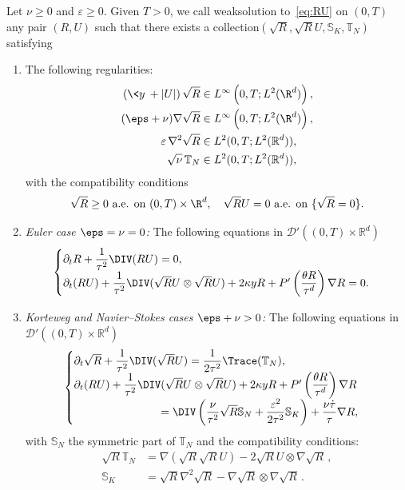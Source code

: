 \begin{defi}\label{def_weaksol}
Let $\nu \ge 0$ and $\varepsilon \ge 0.$ Given $T >0$, we call weak\linebreak solution to~\eqref{eq:RU} on $(0,T)$ any pair $(R,U)$ such that there exists a collection\linebreak $(\sqrt{R},\sqrt{R}U,\mathbb S_{K},\mathbb T_{N})$ satisfying
\begin{enumerate}
\item \label{2.6.1} The following regularities:
\begin{align*}
\left(\<y\>+|U|\right) \sqrt{R} &\in L^{\infty}\left(0,T; L^2 (\R^d)\right),\\
(\eps+\nu)\nabla \sqrt R &\in L^{\infty}\left(0,T; L^2 (\R^d)\right),\\
\varepsilon \, \nabla^2 \sqrt{R} &\in L^2(0,T;L^2(\mathbb R^d)),\\
\sqrt \nu \, \mathbb T_N &\in L^2(0,T; L^2(\mathbb R^d)),
\end{align*}
with the compatibility conditions
\[
\sqrt{R} \ge 0 \text{ a.e. on } (0,T)\times \R^d, \quad \sqrt{R}U= 0 \text{ a.e. on } \{\sqrt{R} = 0 \}.
\]

\item \label{2.6.2} \emph{Euler case $\eps=\nu=0$:} The following equations in $\mathcal D'((0,T)\times \mathbb R^d)$
\begin{equation}\label{eq:NSKrevu-euler}
\begin{cases}
\partial_t{R}+\dfrac{1}{\tau^2}\DIV ({R} U)= 0,\\
\partial_t ({R}U) +\dfrac{1}{\tau^2}\DIV (\sqrt{R}U \otimes \sqrt{R}U) +2\kappa y R + P'\left(\dfrac{\theta R}{\tau^d}\right)\nabla R =0.
\end{cases}
\end{equation}

\item \label{2.6.3} \emph{Korteweg and Navier--Stokes cases $\eps + \nu > 0$:} The following equations in $\mathcal D'((0,T)\times \mathbb R^d)$
\begin{equation}\label{eq:NSKrevu}
\begin{cases}
\partial_t\sqrt{R}+\dfrac{1}{\tau^2}\DIV(\sqrt{R}U)=\dfrac{1}{2\tau^2}\Trace(\mathbb T_N),\\
\partial_t ({R}U) +\dfrac{1}{\tau^2}\DIV (\sqrt{R}U \otimes \sqrt{R}U) +2\kappa y R + P'\left(\dfrac{\theta R}{\tau^d}\right)\nabla R\\
\mkern 140mu =\DIV \left(\dfrac{\nu}{\tau^2} \sqrt R \mathbb S_N + \dfrac{\varepsilon^2}{2\tau^2} \mathbb S_K\right) + \dfrac{\nu \dot{\tau}}{\tau} \nabla R,
\end{cases}
\end{equation}
with $\mathbb S_N$ the symmetric part of $\mathbb T_N$ and the compatibility conditions:
\begin{align}\label{eq_compnewton}
\sqrt{R}\mathbb T_{N} &= \nabla(\sqrt{R} \sqrt{R} U) - 2 \sqrt{R}U \otimes \nabla \sqrt{R}\,, \\
\mathbb S_K &=\sqrt{R}\nabla^2 \sqrt{R} - \nabla \sqrt{R} \otimes \nabla \sqrt{R}
\,. \label{eq_compkorteweg}
\end{align}
\end{enumerate}
\end{defi}

